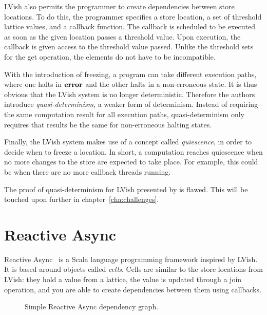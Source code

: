 LVish also permits the programmer to create dependencies between
store locations. To do this, the programmer specifies a store location, a
set of threshold lattice values, and a callback function. The callback is
scheduled to be executed as soon as the given location passes a threshold value.
Upon execution, the callback is given access to the threshold value passed.
Unlike the threshold sets for the get operation, the elements do not have to be
incompatible. 

With the introduction of freezing, a program can take different execution
paths, where one halts in $\mbox{{\bf error}}$ and the other halts in a non-erroneous state.
It is thus obvious that the LVish system is no longer deterministic. Therefore
the authors introduce \emph{quasi-determinism}, a weaker form of
determinism. Instead of requiring the same computation result for all execution
paths, quasi-determinism only requires that results be the same for
non-erroneous halting states.

Finally, the LVish system makes use of a concept called \emph{quiescence}, in
order to decide when to freeze a location. In short, a computation reaches
quiescence when no more changes to the store are expected to take place. For
example, this could be when there are no more callback threads running.

The proof of quasi-determinism for LVish presented by
\textcite{kuper2014freezeTR} is flawed. This will be touched upon further in
chapter~\ref{cha:challenges}.


\section{Reactive Async}\label{sec:reactive_async}

Reactive Async~\parencite{conf/scala/HallerGES16} is a Scala language
programming framework inspired by LVish. It is based around objects called
\emph{cells}.  Cells are similar to the store locations from LVish: they hold a
value from a lattice, the value is updated through a join operation, and you are
able to create dependencies between them using callbacks.

\begin{figure}
  \centering
  \caption{Simple Reactive Async dependency graph.}
  \label{fig:ra_example}
\end{figure}

